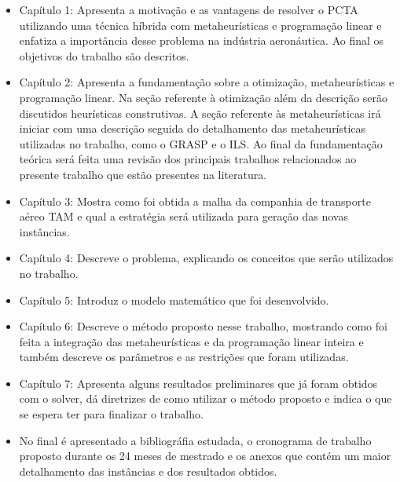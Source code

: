 \begin{itemize}

\item Capítulo 1: Apresenta a motivação e as vantagens de resolver o PCTA
utilizando uma técnica híbrida com metaheurísticas e programação linear e
enfatiza a importância desse problema na indústria aeronáutica. Ao final os
objetivos do trabalho são descritos.

\item Capítulo 2: Apresenta a fundamentação sobre a otimização, metaheurísticas
e programação linear. Na seção referente à otimização além da descrição serão
discutidos heurísticas construtivas. A seção referente às metaheurísticas irá
iniciar com uma descrição seguida do detalhamento das metaheurísticas
utilizadas no trabalho, como o GRASP e o ILS. Ao final da fundamentação teórica
será feita uma revisão dos principais trabalhos relacionados ao presente
trabalho que estão presentes na literatura.

\item Capítulo 3: Mostra como foi obtida a malha da companhia de transporte aéreo TAM e qual a estratégia será utilizada para geração das novas instâncias.

\item Capítulo 4: Descreve o problema, explicando os conceitos que serão utilizados no trabalho.

\item Capítulo 5: Introduz o modelo matemático que foi desenvolvido.

\item Capítulo 6: Descreve o método proposto nesse trabalho, mostrando como foi feita a integração das metaheurísticas e da programação linear inteira e também descreve os parâmetros e as restrições que foram utilizadas.

\item Capítulo 7: Apresenta alguns resultados preliminares que já foram obtidos com o solver, dá diretrizes de como utilizar o método proposto e indica o que se espera ter para finalizar o trabalho.

\item No final é apresentado a bibliográfia estudada, o cronograma de trabalho proposto durante os 24 meses de mestrado e os anexos que contém um maior detalhamento das instâncias e dos resultados obtidos.

\end{itemize}